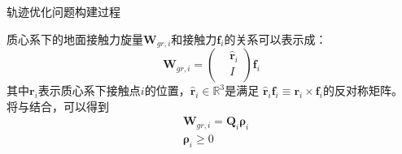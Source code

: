 \begin{algorithm}[htbp]
    \caption{\label{alg:traj_optimization}轨迹优化问题构建过程} 
    \end{algorithm}
质心系下的地面接触力旋量${{\boldsymbol{W}}_{gr,i}}$和接触力${{\boldsymbol{f}}_{i}}$的关系可以表示成：
\begin{equation}
    \label{equ:contact_wrench}
    {\boldsymbol{W}_{gr,i}}=\left( \begin{aligned}
        & {{{\hat{\boldsymbol{r}}}}_{i}} \\ 
       & I \\ 
      \end{aligned} \right){\boldsymbol{f}_{i}}      
\end{equation}
其中${\boldsymbol{r}_{i}}$表示质心系下接触点$i$的位置，${{\hat{\boldsymbol{r}}}_{i}}\in {{\mathbb{R}}^{3}}$是满足
${{\hat{\boldsymbol{r}}}_{i}}{\boldsymbol{f}_{i}}\equiv {\boldsymbol{r}_{i}}\times {\boldsymbol{f}_{i}}$的反对称矩阵。
将与结合，可以得到
\begin{equation}
    \label{equ:wrench_matrix}
    \begin{aligned}
        & {{\boldsymbol{W}}_{gr,i}}={{\boldsymbol{Q}}_{i}}{{\boldsymbol{\rho}}_{i}} \\ 
       & {{\boldsymbol{\rho}}_{i}}\ge 0 \\ 
      \end{aligned}        
\end{equation}
